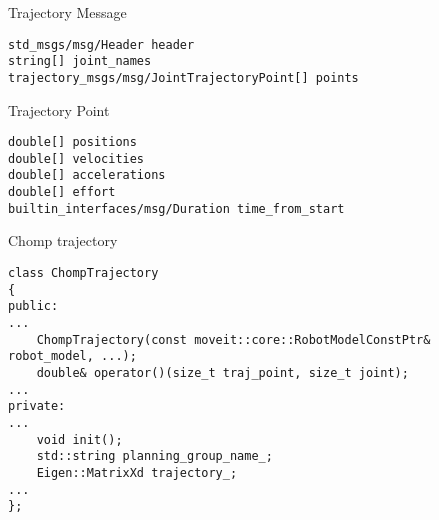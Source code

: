 \begin{frame}[fragile]
\begin{columns}
\begin{column}{0.5\textwidth}
		\end{column}
		\begin{column}{0.5\textwidth}
			Trajectory Message
			\begin{lstlisting}[basicstyle=\fontsize{5pt}{0pt}\selectfont\fontfamily{zi4}\selectfont]
std_msgs/msg/Header header
string[] joint_names
trajectory_msgs/msg/JointTrajectoryPoint[] points
            \end{lstlisting}
			Trajectory Point
			\begin{lstlisting}
double[] positions
double[] velocities
double[] accelerations
double[] effort
builtin_interfaces/msg/Duration time_from_start
                \end{lstlisting}
			Chomp trajectory
			\begin{lstlisting}
class ChompTrajectory
{
public:
...
    ChompTrajectory(const moveit::core::RobotModelConstPtr& robot_model, ...);
    double& operator()(size_t traj_point, size_t joint);
...
private:
...
    void init(); 
    std::string planning_group_name_;  
    Eigen::MatrixXd trajectory_;      
...
};
                \end{lstlisting}
		\end{column}
	\end{columns}
\end{frame}
